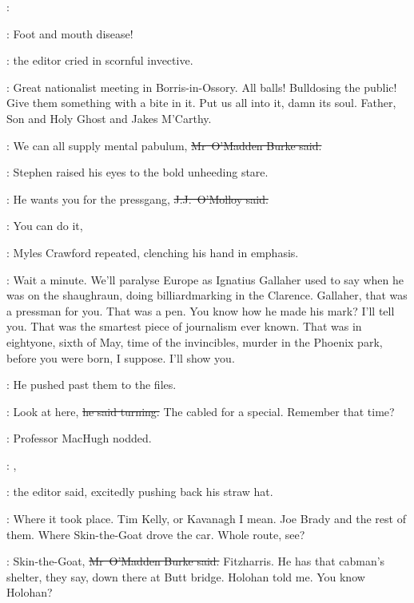 \StephenInt:

\crawford:
Foot and mouth disease!

:
the editor cried in scornful invective.

\crawford:
Great nationalist meeting in Borris-in-Ossory.
All balls!
Bulldosing the public!
Give them something with a bite in it.
Put us all into it,
damn its soul.
Father, Son and Holy Ghost
and Jakes M'Carthy.

\omaddenburke:
We can all supply mental pabulum,
\sout{Mr~O'Madden Burke said.}

:
Stephen raised his eyes to the bold unheeding stare.

\jjom:
He wants you for the pressgang,
\sout{J.J.~O'Molloy said.}



\crawford:
You can do it,

:
Myles Crawford repeated,
clenching his hand in emphasis.

\crawford:
Wait a minute.
We'll paralyse Europe as Ignatius Gallaher used to say
when he was on the shaughraun,
doing billiardmarking in the Clarence.
Gallaher, that was a pressman for you.
That was a pen.
You know how he made his mark?
I'll tell you.
That was the smartest piece of journalism ever known.
That was in eightyone, sixth of May,
time of the invincibles,
murder in the Phoenix park,
before you were born, I suppose.
I'll show you.

:
He pushed past them to the files.

\crawford:
Look at here,
\sout{he said turning.}
The  cabled for a special.
Remember that time?

:
Professor MacHugh nodded.

\crawford:
,

:
the editor said,
excitedly pushing back his straw hat.

\crawford:
Where it took place.
Tim Kelly, or Kavanagh I mean.
Joe Brady and the rest of them.
Where Skin-the-Goat drove the car.
Whole route, see?

\omaddenburke:
Skin-the-Goat,
\sout{Mr~O'Madden Burke said.}
Fitzharris.
He has that cabman's shelter, they say,
down there at Butt bridge.
Holohan told me.
You know Holohan?

